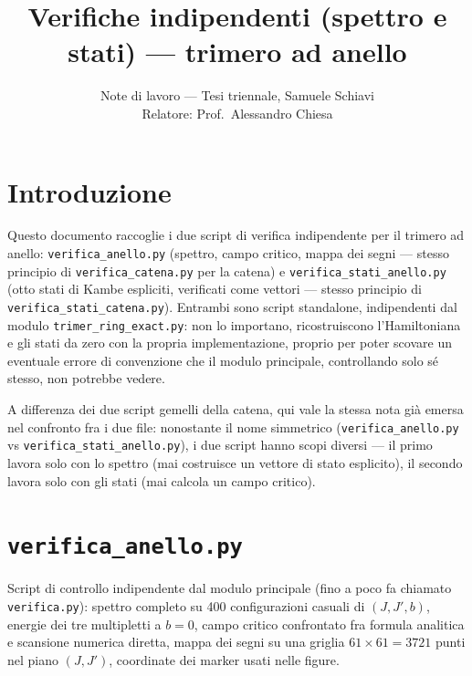 \documentclass[11pt,a4paper]{article}
\title{Verifiche indipendenti (spettro e stati) — trimero ad anello}
\author{Note di lavoro — Tesi triennale, Samuele Schiavi\\ Relatore: Prof.\ Alessandro Chiesa}
\date{}
\begin{document}
\maketitle

\section*{Introduzione}

Questo documento raccoglie i due script di verifica indipendente per il trimero ad
anello: \texttt{verifica\_anello.py} (spettro, campo critico, mappa dei segni — stesso
principio di \texttt{verifica\_catena.py} per la catena) e
\texttt{verifica\_stati\_anello.py} (otto stati di Kambe espliciti, verificati come
vettori — stesso principio di \texttt{verifica\_stati\_catena.py}). Entrambi sono
script standalone, indipendenti dal modulo \texttt{trimer\_ring\_exact.py}: non lo
importano, ricostruiscono l'Hamiltoniana e gli stati da zero con la propria
implementazione, proprio per poter scovare un eventuale errore di convenzione che il
modulo principale, controllando solo sé stesso, non potrebbe vedere.

A differenza dei due script gemelli della catena, qui vale la stessa nota già emersa
nel confronto fra i due file: nonostante il nome simmetrico
(\texttt{verifica\_anello.py} vs \texttt{verifica\_stati\_anello.py}), i due script
hanno scopi diversi — il primo lavora solo con lo spettro (mai costruisce un vettore
di stato esplicito), il secondo lavora solo con gli stati (mai calcola un campo
critico).

\section*{\texttt{verifica\_anello.py}}

Script di controllo indipendente dal modulo principale (fino a poco fa chiamato
\texttt{verifica.py}): spettro completo su 400 configurazioni casuali di $(J,J',b)$,
energie dei tre multipletti a $b=0$, campo critico confrontato fra formula analitica
e scansione numerica diretta, mappa dei segni su una griglia $61\times61=3721$ punti
nel piano $(J,J')$, coordinate dei marker usati nelle figure.
\end{document}
